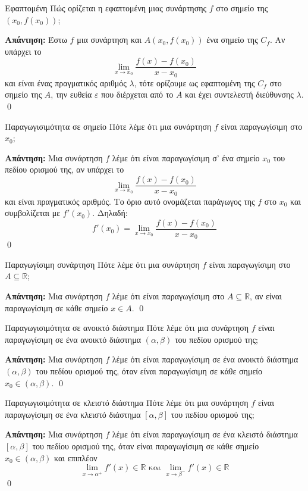 \documentclass[a4paper, 12pt]{article}
\renewenvironment{proof}[1][\textbf{Απάντηση}]{%
  \par\noindent\textbf{#1:} \rmfamily}{\qed\par}
\begin{document}
\begin{theorem}{Εφαπτομένη}
  Πώς ορίζεται η εφαπτομένη μιας συνάρτησης $f$ στο σημείο της $(x_0, f(x_0))$;
\end{theorem}
\begin{proof}
  Έστω $f$ μια συνάρτηση και $Α(x_0, f( x_0))$ ένα σημείο της $C_f$. Αν υπάρχει το
  $$\lim_{x \to x_0} \dfrac{f(x) - f(x_0)}{x - x_0}$$
  και είναι ένας πραγματικός αριθμός $λ$, τότε ορίζουμε ως εφαπτομένη της $C_f$ στο σημείο της $A$, την ευθεία $ε$ που διέρχεται από το $A$ και έχει συντελεστή διεύθυνσης $λ$.
\end{proof}

\begin{theorem}{Παραγωγισιμότητα σε σημείο}
  Πότε λέμε ότι μια συνάρτηση $f$ είναι παραγωγίσιμη στο $x_0$;
\end{theorem}
\begin{proof}
  Μια συνάρτηση $f$ λέμε ότι είναι παραγωγίσιμη σ’ ένα σημείο $x_0$ του πεδίου ορισμού της, αν υπάρχει το
  $$\lim_{x \to x_0} \dfrac{f(x) - f(x_0)}{x - x_0}$$
  και είναι πραγματικός αριθμός. Το όριο αυτό ονομάζεται παράγωγος της $f$ στο $x_0$ και συμβολίζεται με $f'(x_0)$.
  Δηλαδή:
  $$f'(x_0) = \lim_{x \to x_0} \dfrac{f(x) - f(x_0)}{x - x_0}$$
\end{proof}

\begin{theorem}{Παραγωγίσιμη συνάρτηση}
  Πότε λέμε ότι μια συνάρτηση $f$ είναι παραγωγίσιμη στο $A\subseteq \mathbb{R}$;
\end{theorem}
\begin{proof}
  Μια συνάρτηση $f$ λέμε ότι είναι παραγωγίσιμη στο $A\subseteq \mathbb{R}$, αν είναι παραγωγίσιμη σε κάθε σημείο $x\in A$.
\end{proof}

\begin{theorem}{Παραγωγισιμότητα σε ανοικτό διάστημα}
  Πότε λέμε ότι μια συνάρτηση $f$ είναι παραγωγίσιμη σε ένα ανοικτό διάστημα $(α,β)$ του πεδίου ορισμού της;
\end{theorem}
\begin{proof}
  Μια συνάρτηση $f$ λέμε ότι είναι παραγωγίσιμη σε ένα ανοικτό διάστημα $(α, β)$ του πεδίου ορισμού της, όταν είναι παραγωγίσιμη σε κάθε σημείο $x_0 \in (α , β )$.
\end{proof}

\begin{theorem}{Παραγωγισιμότητα σε κλειστό διάστημα}
  Πότε λέμε ότι μια συνάρτηση $f$ είναι παραγωγίσιμη σε ένα κλειστό διάστημα $[α, β]$ του πεδίου ορισμού της;
\end{theorem}
\begin{proof}
  Μια συνάρτηση $f$ λέμε ότι είναι παραγωγίσιμη σε ένα κλειστό διάστημα $[α, β]$ του πεδίου ορισμού της, όταν είναι παραγωγίσιμη σε κάθε σημείο $x_0 \in (α , β )$ και επιπλέον
  $$\lim_{x \to α^+} f'(x) \in \mathbb{R} \text{ και } \lim_{x \to β^-} f'(x) \in \mathbb{R}$$
\end{proof}
\end{document}
